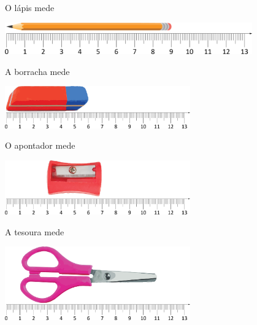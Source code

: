 \begin{escolha}

\item O lápis mede 

\begin{center}
\noindent\includegraphics[width=0.8\textwidth]{./media/image42.png}
\end{center}

\item A borracha mede 

\begin{center}
\noindent\includegraphics[width=0.6\textwidth]{./media/image43.png}
\end{center}

\item O apontador mede 

\begin{center}
\noindent\includegraphics[width=0.6\textwidth]{./media/image44.png}
\end{center}

\item A tesoura mede 

\begin{center}
\noindent\includegraphics[width=0.6\textwidth]{./media/image45.png}
\end{center}
\end{escolha}


